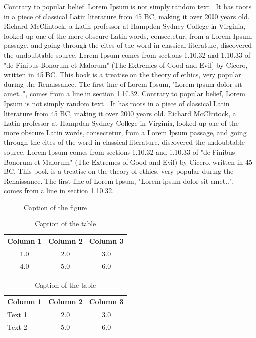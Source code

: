 \documentclass[twoside]{ASDJ}
\begin{document}
Contrary to popular belief, Lorem Ipsum is not simply random text  \cite{lorem}. It has roots in a piece of classical Latin literature from 45 BC, making it over 2000 years old. Richard McClintock, a Latin professor at Hampden-Sydney College in Virginia, looked up one of the more obscure Latin words, consectetur, from a Lorem Ipsum passage, and going through the cites of the word in classical literature, discovered the undoubtable source. Lorem Ipsum comes from sections 1.10.32 and 1.10.33 of "de Finibus Bonorum et Malorum" (The Extremes of Good and Evil) by Cicero, written in 45 BC. This book is a treatise on the theory of ethics, very popular during the Renaissance. The first line of Lorem Ipsum, "Lorem ipsum dolor sit amet..", comes from a line in section 1.10.32.
Contrary to popular belief, Lorem Ipsum is not simply random text  \cite{lorem}. It has roots in a piece of classical Latin literature from 45 BC, making it over 2000 years old. Richard McClintock, a Latin professor at Hampden-Sydney College in Virginia, looked up one of the more obscure Latin words, consectetur, from a Lorem Ipsum passage, and going through the cites of the word in classical literature, discovered the undoubtable source. Lorem Ipsum comes from sections 1.10.32 and 1.10.33 of "de Finibus Bonorum et Malorum" (The Extremes of Good and Evil) by Cicero, written in 45 BC. This book is a treatise on the theory of ethics, very popular during the Renaissance. The first line of Lorem Ipsum, "Lorem ipsum dolor sit amet..", comes from a line in section 1.10.32.


\begin{figure}
\caption{Caption of the figure}
\end{figure}


\begin{table}
\begin{tabular}{ccc}
  Column 1 & Column 2 & Column 3 \\
  \hline
  \hline
  1.0 & 2.0 & 3.0 \\
  4.0 & 5.0 & 6.0 \\
  \hline
\end{tabular}
\caption{Caption of the table}
\end{table}


\begin{table}
\begin{tabular}{lcc}
  Column 1 & Column 2 & Column 3 \\
  \hline
  \hline
  Text 1 & 2.0 & 3.0 \\
  Text 2 & 5.0 & 6.0 \\
  \hline
\end{tabular}
\caption{Caption of the table}
\end{table}



\end{document}
